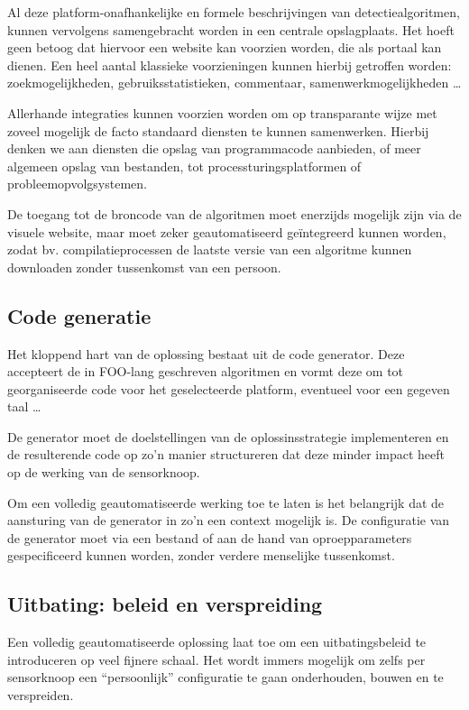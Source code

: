 Al deze platform-onafhankelijke en formele beschrijvingen van
detectiealgoritmen, kunnen vervolgens samengebracht worden in een centrale
opslagplaats. Het hoeft geen betoog dat hiervoor een website kan voorzien
worden, die als portaal kan dienen. Een heel aantal klassieke voorzieningen
kunnen hierbij getroffen worden: zoekmogelijkheden, gebruiksstatistieken,
commentaar, samenwerkmogelijkheden \dots

Allerhande integraties kunnen voorzien worden om op transparante wijze met
zoveel mogelijk de facto standaard diensten te kunnen samenwerken. Hierbij
denken we aan diensten die opslag van programmacode aanbieden, of meer algemeen
opslag van bestanden, tot processturingsplatformen of probleemopvolgsystemen.

De toegang tot de broncode van de algoritmen moet enerzijds mogelijk zijn via
de visuele website, maar moet zeker geautomatiseerd ge\"integreerd kunnen
worden, zodat bv. compilatieprocessen de laatste versie van een algoritme
kunnen downloaden zonder tussenkomst van een persoon.

\subsection{Code generatie}
\label{subsection:arch-codegen}

Het kloppend hart van de oplossing bestaat uit de code generator. Deze
accepteert de in FOO-lang geschreven algoritmen en vormt deze om tot
georganiseerde code voor het geselecteerde platform, eventueel voor een gegeven
taal \dots

De generator moet de doelstellingen van de oplossinsstrategie implementeren en
de resulterende code op zo'n manier structureren dat deze minder impact heeft
op de werking van de sensorknoop.

Om een volledig geautomatiseerde werking toe te laten is het belangrijk dat de
aansturing van de generator in zo'n een context mogelijk is. De configuratie
van de generator moet via een bestand of aan de hand van oproepparameters
gespecificeerd kunnen worden, zonder verdere menselijke tussenkomst.

\subsection{Uitbating: beleid en verspreiding}
\label{subsection:arch-policy}

Een volledig geautomatiseerde oplossing laat toe om een uitbatingsbeleid te
introduceren op veel fijnere schaal. Het wordt immers mogelijk om zelfs per
sensorknoop een ``persoonlijk'' configuratie te gaan onderhouden, bouwen en te
verspreiden.

